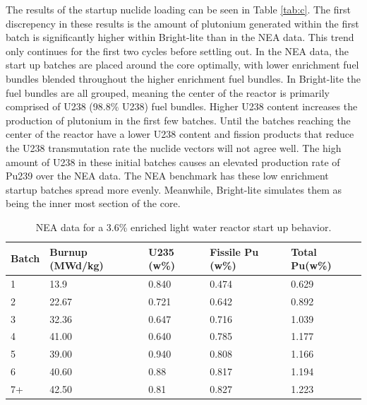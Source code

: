 \documentclass{article}
\begin{document}
The results of the startup nuclide loading can be seen in Table \ref{tab:c}.
The first discrepency in these results is the amount of plutonium generated
within the first batch is significantly higher within Bright-lite than in the NEA data.
This trend only continues for the first two cycles before settling out. In the NEA data, the start up batches 
are placed around the core optimally, with lower enrichment fuel bundles blended throughout the 
higher enrichment fuel bundles. In Bright-lite the fuel bundles are all grouped, meaning the center of 
the reactor is primarily comprised of U238 (98.8\% U238) fuel bundles. Higher U238 content
increases the production of plutonium in the first few batches. Until the batches reaching the center of
the reactor have a lower U238 content and fission products that reduce the U238 transmutation 
rate the nuclide vectors will not agree well. The high amount of U238 in these initial batches causes an elevated production rate of
Pu239 over the NEA data. The NEA benchmark has these low enrichment startup batches
spread more evenly. Meanwhile, Bright-lite simulates them as being the inner most section of the core.

\begin{table}[!htb]
\centering
\caption{NEA data for a 3.6\% enriched light water reactor start up behavior.}
\label{tab:d}
\begin{tabular}{lllll}
Batch & Burnup (MWd/kg) & U235 (w\%) & Fissile Pu (w\%) & Total Pu(w\%) \\
\hline
1 & 13.9 & 0.840 & 0.474 & 0.629 \\
2 & 22.67 & 0.721 & 0.642 & 0.892 \\
3 & 32.36 & 0.647 & 0.716 & 1.039 \\
4 & 41.00 & 0.640 & 0.785 & 1.177 \\
5 & 39.00 & 0.940 & 0.808 & 1.166 \\
6 & 40.60 & 0.88 & 0.817 & 1.194 \\
7+ & 42.50 & 0.81 & 0.827 & 1.223
\end{tabular}
\end{table}
\end{document}
